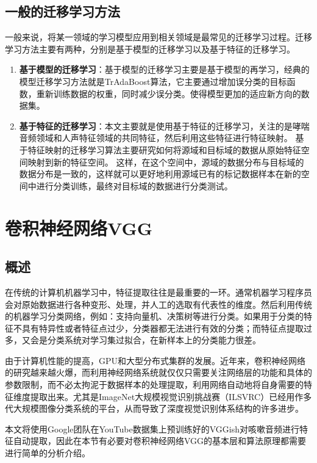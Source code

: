 \subsection{一般的迁移学习方法}
一般来说，将某一领域的学习模型应用到相关领域是最常见的迁移学习过程。迁移学习方法主要有两种，分别是基于模型的迁移学习以及基于特征的迁移学习。
\begin{enumerate}
    \item \textbf{基于模型的迁移学习}：基于模型的迁移学习主要是基于模型的再学习，经典的模型迁移学习方法就是TrAdaBoost算法，它主要通过增加误分类的目标函数，重新训练数据的权重，同时减少误分类。使得模型更加的适应新方向的数据集。
    \item \textbf{基于特征的迁移学习}：本文主要就是使用基于特征的迁移学习，关注的是哮喘音频领域和人声特征领域的共同特征，然后利用这些特征进行特征映射。
    基于特征映射的迁移学习算法主要研究如何将源域和目标域的数据从原始特征空间映射到新的特征空间。
    这样，在这个空间中，源域的数据分布与目标域的数据分布是一致的，这样就可以更好地利用源域已有的标记数据样本在新的空间中进行分类训练，最终对目标域的数据进行分类测试。
\end{enumerate}
\section{卷积神经网络VGG}
\subsection{概述}
在传统的计算机机器学习中，特征提取往往是最重要的一环。通常机器学习程序员会对原始数据进行各种变形、处理，并人工的选取有代表性的维度。然后利用传统的机器学习分类网络，例如：支持向量机、决策树等进行分类。如果用于分类的特征不具有特异性或者特征点过少，分类器都无法进行有效的分类；而特征点提取过多，又会是分类系统对学习集过拟合，在新样本上的分类能力很差。

由于计算机性能的提高，GPU和大型分布式集群的发展。近年来，卷积神经网络的研究越来越火爆，而利用神经网络系统就仅仅只需要关注网络层的功能和具体的参数限制，而不必太拘泥于数据样本的处理提取，利用网络自动地将自身需要的特征维度提取出来。尤其是ImageNet大规模视觉识别挑战赛（ILSVRC）\cite{russakovsky2015imagenet}已经用作多代大规模图像分类系统的平台，从而导致了深度视觉识别体系结构的许多进步。 

本文将使用Google团队在YouTube数据集上预训练好的VGGish对咳嗽音频进行特征自动提取，因此在本节有必要对卷积神经网络VGG的基本层和算法原理都需要进行简单的分析介绍。
